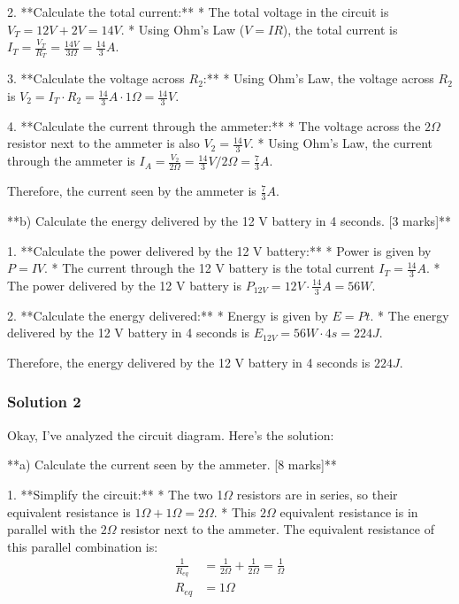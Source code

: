 \documentclass{article}
\begin{document}
2. **Calculate the total current:**
    * The total voltage in the circuit is $V_T = 12 V + 2 V = 14 V$.
    * Using Ohm's Law ($V = IR$), the total current is $I_T = \frac{V_T}{R_T} = \frac{14 V}{3 \Omega} = \frac{14}{3} A$.

3. **Calculate the voltage across $R_2$:**
    * Using Ohm's Law, the voltage across $R_2$ is $V_2 = I_T \cdot R_2 = \frac{14}{3} A \cdot 1 \Omega = \frac{14}{3} V$.

4. **Calculate the current through the ammeter:**
    * The voltage across the $2 \Omega$ resistor next to the ammeter is also $V_2 = \frac{14}{3} V$.
    * Using Ohm's Law, the current through the ammeter is $I_A = \frac{V_2}{2 \Omega} = \frac{14}{3} V / 2 \Omega = \frac{7}{3} A$.

Therefore, the current seen by the ammeter is $\boxed{\frac{7}{3} A}$.


**b) Calculate the energy delivered by the 12 V battery in 4 seconds. [3 marks]**

1. **Calculate the power delivered by the 12 V battery:**
    * Power is given by $P = IV$.
    * The current through the 12 V battery is the total current $I_T = \frac{14}{3} A$.
    * The power delivered by the 12 V battery is $P_{12V} = 12 V \cdot \frac{14}{3} A = 56 W$.

2. **Calculate the energy delivered:**
    * Energy is given by $E = Pt$.
    * The energy delivered by the 12 V battery in 4 seconds is $E_{12V} = 56 W \cdot 4 s = 224 J$.

Therefore, the energy delivered by the 12 V battery in 4 seconds is $\boxed{224 J}$.


\subsubsection{Solution 2}
Okay, I've analyzed the circuit diagram. Here's the solution:

**a) Calculate the current seen by the ammeter. [8 marks]**

1. **Simplify the circuit:**
    * The two 1\(\Omega\) resistors are in series, so their equivalent resistance is \(1\Omega + 1\Omega = 2\Omega\).
    * This \(2\Omega\) equivalent resistance is in parallel with the \(2\Omega\) resistor next to the ammeter. The equivalent resistance of this parallel combination is: 
       \begin{align*}
       \frac{1}{R_{eq}} &= \frac{1}{2\Omega} + \frac{1}{2\Omega} = \frac{1}{\Omega} \\
       R_{eq} &= 1\Omega
       \end{align*}
\end{document}

